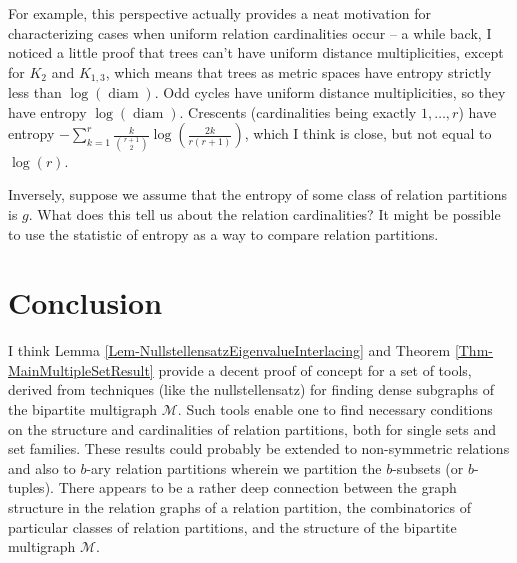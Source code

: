\documentclass[12pt]{article}
\DeclareMathOperator{\diam}{diam}
\theoremstyle{definition}
\begin{document}
	For example, this perspective actually provides a neat motivation for characterizing cases when uniform relation cardinalities occur -- a while back, I noticed a little proof that trees can't have uniform distance multiplicities, except for $K_2$ and $K_{1,3}$, which means that trees as metric spaces have entropy strictly less than $\log(\diam)$.  Odd cycles have uniform distance multiplicities, so they have entropy $\log(\diam)$.  Crescents (cardinalities being exactly $1, \ldots, r$) have entropy $-\sum_{k = 1}^r \frac{k}{{r+1\choose 2}} \log(\tfrac{2k}{r(r+1)})$, which I think is close, but not equal to $\log(r)$.
	
	Inversely, suppose we assume that the entropy of some class of relation partitions is $g$.  What does this tell us about the relation cardinalities?  It might be possible to use the statistic of entropy as a way to compare relation partitions.
	
	\section{Conclusion}
	I think Lemma \ref{Lem-NullstellensatzEigenvalueInterlacing} and Theorem \ref{Thm-MainMultipleSetResult} provide a decent proof of concept for a set of tools, derived from techniques (like the nullstellensatz) for finding dense subgraphs of the bipartite multigraph $\mathcal{M}$.  Such tools enable one to find necessary conditions on the structure and cardinalities of relation partitions, both for single sets and set families.  These results could probably be extended to non-symmetric relations and also to $b$-ary relation partitions wherein we partition the $b$-subsets (or $b$-tuples).  There appears to be a rather deep connection between the graph structure in the relation graphs of a relation partition, the combinatorics of particular classes of relation partitions, and the structure of the bipartite multigraph $\mathcal{M}$.
	
	
\end{document}
